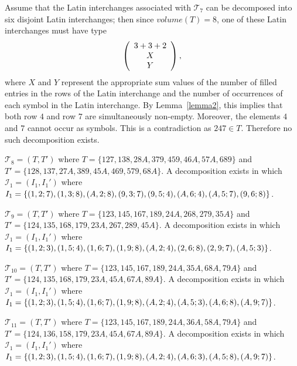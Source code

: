 \documentclass[12pt]{report}
\begin{document}
Assume that the Latin interchanges associated 
with ${\mathcal T}_7$ can be decomposed into six disjoint 
Latin interchanges; then since  $volume(T)=8$, one of these 
Latin interchanges must have type
\begin{eqnarray*}
\left(
\begin{array}{c}
    3+3+2\cr
X\\
Y
\end{array}
\right),
\end{eqnarray*}
where $X$ and $Y$ represent the appropriate sum values of  
the number of filled entries in the rows of the Latin interchange
and the number of occurrences of each symbol in the Latin interchange.
By Lemma~\ref{lemma2}, this implies that both row $4$ and row $7$ are 
simultaneously non-empty. Moreover, the elements $4$ and $7$ cannot
occur as symbols. This is a contradiction as $247\in T$.
Therefore no such decomposition exists.
\vspace{.5cm}

 ${\mathcal T}_8=(T,T')$ 
where $T=\{1 2 7,1 3 8,2 8 A,3 7 9,4 5 9,4 6 A,5 7 A,
6 8 9\}$ 
and $T'=\{1 2 8,1 3 7,2 7 A,3 8 9,4 5 A,4 6 9,5 7 9,6 8 A \}$.
A decomposition exists in which
$\mathcal{I}_1 = (I_1,I_1')$ where 
$I_1=\{(1, 2; 7),(1, 3; 8), 
(A, 2; 8),(9, 3; 7),(9, 5; 4),
(A, 6; 4),\break (A, 5; 7),(9, 6; 8)\}$.  
\vspace{0.5cm}

 ${\mathcal T}_9=(T,T')$ 
where $T=\{1 2 3,1 4 5,1 6 7,1 8 9,2 4 A,2 6 8,2 7 9,
3 5 A\}$ and 
$T'=\{1 2 4,1 3 5,1 6 8,1 7 9,2 3 A,2 6 7,2 8 9,4 5 A\}$.
A decomposition exists in which
$\mathcal{I}_1 = (I_1,I_1')$ where 
$I_1=\{(1, 2; 3),(1, 5; 4),
(1, 6; 7),(1, 9; 8),(A, 2; 4),
(2, 6; 8),(2, 9; 7),\break (A, 5; 3)\}$.
\vspace{0.5cm}

 ${\mathcal T}_{10}=(T,T')$ where 
$T=\{1 2 3,1 4 5,1 6 7,1 8 9,2 4 A,3 5 A,6 8 A,
7 9 A\}$ and 
$T'=\{1 2 4,1 3 5,1 6 8,1 7 9,2 3 A,4 5 A,6 7 A,8 9 A \}$.
A decomposition exists in which
$\mathcal{I}_1 = (I_1,I_1')$ where 
$I_1=\{(1, 2; 3),(1, 5; 4),
(1, 6; 7),
(1, 9; 8),(A, 2; 4),(A, 5; 3),
(A, 6; 8),\break (A, 9; 7)\}$.
\vspace{0.5cm}

 ${\mathcal T}_{11}=(T,T')$ 
where $T=\{1 2 3,1 4 5,1 6 7,1 8 9,2 4 A,3 6 A,5 8 A,
7 9 A\}$ 
and $T'=\{1 2 4,1 3 6,1 5 8,1 7 9, 2 3 A,4 5 A,6 7 A,8 9 A \}$.
A decomposition exists in which
$\mathcal{I}_1 = (I_1,I_1')$ where 
$I_1=\{(1, 2; 3),(1, 5; 4),(1, 6; 7),
(1, 9; 8),(A, 2; 4),(A, 6; 3),
(A, 5; 8),\break (A, 9; 7)\}$.
\vspace{0.5cm}
\end{document}
